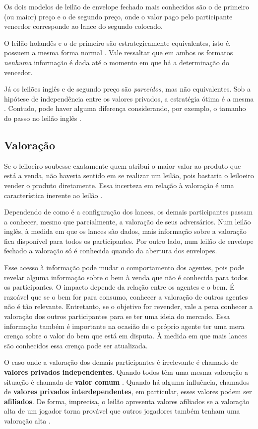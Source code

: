 Os dois modelos de leilão de envelope fechado mais conhecidos são o de primeiro (ou maior) preço e o de segundo preço, onde o valor pago pelo participante vencedor corresponde ao lance do segundo colocado.

O leilão holandês e o de primeiro são estrategicamente equivalentes, isto é, possuem a mesma forma normal \citet{krishna}. Vale ressaltar que em ambos os formatos \emph{nenhuma} informação é dada até o momento em que há a determinação do vencedor.

Já os leilões inglês e de segundo preço são \emph{parecidos}, mas não equivalentes. Sob a hipótese de independência entre os valores privados, a estratégia ótima é a mesma \citet{krishna}. Contudo, pode haver alguma diferença considerando, por exemplo, o tamanho do passo no leilão inglês \citet{Shoham2008}.

\subsection{Valoração}

Se o leiloeiro soubesse exatamente quem atribui o maior valor ao produto que está a venda, não haveria sentido em se realizar um leilão, pois bastaria o leiloeiro vender o produto diretamente. Essa incerteza em relação à valoração é uma característica inerente ao leilão \citet{krishna}.

Dependendo de como é a configuração dos lances, os demais participantes passam a conhecer, mesmo que parcialmente, a valoração de seus adversários. Num leilão inglês, à medida em que os lances são dados, mais informação sobre a valoração fica disponível para todos os participantes. Por outro lado, num leilão de envelope fechado a valoração só é conhecida quando da abertura dos envelopes.

Esse acesso à informação pode mudar o comportamento dos agentes, pois pode revelar alguma informação sobre o bem à venda que não é conhecida para todos os participantes. O impacto depende da relação entre os agentes e o bem. É razoável que se o bem for para consumo, conhecer a valoração de outros agentes não é tão relevante. Entretanto, se o objetivo for revender, vale a pena conhecer a valoração dos outros participantes para se ter uma ideia do mercado. Essa informação também é importante na ocasião de o próprio agente ter uma mera crença sobre o valor do bem que está em disputa. À medida em que mais lances são conhecidos essa crença pode ser atualizada.

O caso onde a valoração dos demais participantes é irrelevante é chamado de \textbf{valores privados independentes}. Quando todos têm uma mesma valoração a situação é chamada de \textbf{valor comum} \citet{krishna}. Quando há alguma influência, chamados de \textbf{valores privados interdependentes}, em particular, esses valores podem ser \textbf{afiliados}. De forma, imprecisa, o leilão apresenta valores afiliados se a valoração alta de um jogador torna provável que outros jogadores também tenham uma valoração alta \citet{Klemperer2004-qd}.

